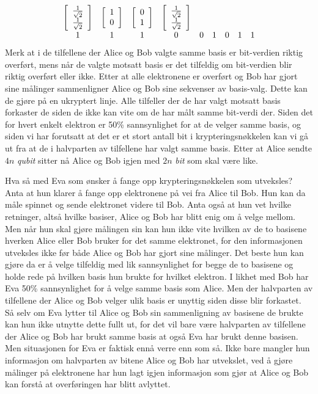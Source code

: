 \begin{displaymath}
\begin{array}{ccccccccc}
	\left[\begin{array}{c}\frac{1}{\sqrt{2}}\\ \frac{1}{\sqrt{2}}\end{array}\right] &
	\left[\begin{array}{c}1\\0\end{array}\right]&
	\left[\begin{array}{c}0\\1\end{array}\right]&
	\left[\begin{array}{c}\frac{1}{\sqrt{2}}\\ \frac{1}{\sqrt{2}}\end{array}\right] \\
	1&1&1&0&0&1&0&1&1 \\
\end{array}
\end{displaymath}
Merk at i de tilfellene der Alice og Bob valgte samme basis er bit-verdien riktig overført, mens når de valgte motsatt basis er det tilfeldig om bit-verdien blir riktig overført eller ikke. Etter at alle elektronene er overført og Bob har gjort sine målinger sammenligner Alice og Bob sine sekvenser av basis-valg. Dette kan de gjøre på en ukryptert linje. Alle tilfeller der de har valgt motsatt basis forkaster de siden de ikke kan vite om de har målt samme bit-verdi der. Siden det for hvert enkelt elektron er 50\% sannsynlighet for at de velger samme basis, og siden vi har forutsatt at det er et stort antall bit i krypteringsnøkkelen kan vi gå ut fra at de i halvparten av tilfellene har valgt samme basis. Etter at Alice sendte $4n$ \emph{qubit} sitter nå Alice og Bob igjen med $2n$ \emph{bit} som skal være like.

Hva så med Eva som ønsker å fange opp krypteringsnøkkelen som utveksles? Anta at hun klarer å fange opp elektronene på vei fra Alice til Bob. Hun kan da måle spinnet og sende elektronet videre til Bob. Anta også at hun vet hvilke retninger, altså hvilke basiser, Alice og Bob har blitt enig om å velge mellom. Men når hun skal gjøre målingen sin kan hun ikke vite hvilken av de to basisene hverken Alice eller Bob bruker for det samme elektronet, for den informasjonen utveksles ikke før både Alice og Bob har gjort sine målinger. Det beste hun kan gjøre da er å velge tilfeldig med lik sannsynlighet for begge de to basisene og holde rede på hvilken basis hun brukte for hvilket elektron. I likhet med Bob har Eva 50\% sannsynlighet for å velge samme basis som Alice. Men der halvparten av tilfellene der Alice og Bob velger ulik basis er unyttig siden disse blir forkastet. Så selv om Eva lytter til Alice og Bob sin sammenligning av basisene de brukte kan hun ikke utnytte dette fullt ut, for det vil bare være halvparten av tilfellene der Alice og Bob har brukt samme basis at også Eva har brukt denne basisen. Men situasjonen for Eva er faktisk ennå verre enn som så. Ikke bare mangler hun informasjon om halvparten av bitene Alice og Bob har utvekslet, ved å gjøre målinger på elektronene har hun lagt igjen informasjon som gjør at Alice og Bob kan forstå at overføringen har blitt avlyttet.

